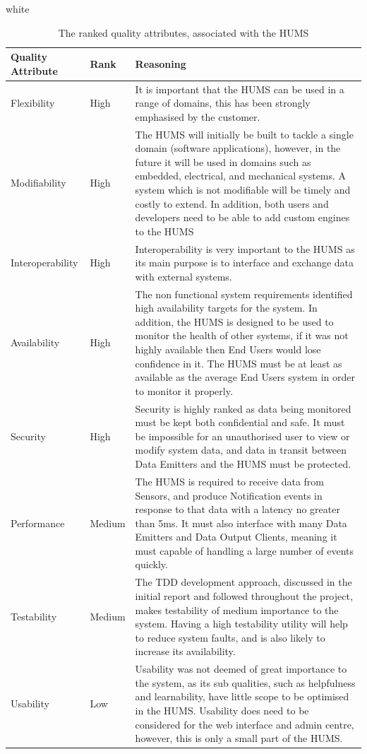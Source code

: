\documentclass[10pt,a4paper]{article}
\newcommand{\tableformat}[4]{
\begin{table}[H]
\centering
  \rowcolors{2}{gray!10} {white}
\begin{tabular}{#1}
  \hline
  \rowcolor[gray]{0.9} #2
\end{tabular}
\caption{#3}
\label{#4}
\end{table}}
\begin{document}
\tableformat{p{2.4cm} p{1.2cm} p{11.2cm}}{
\hline
Quality \qquad Attribute & Rank & Reasoning \\
\hline
Flexibility & High &  It is important that the HUMS can be used in a range of domains, this has been strongly emphasised by the customer. 
\\
Modifiability & High & The HUMS will initially be built to tackle a single domain (software applications), however, in the future it will be used in domains such as embedded, electrical, and mechanical systems. A system which is not modifiable will be timely and costly to extend. In addition, both users and developers need to be able to add custom engines to the HUMS
\\
Interoperability & High & Interoperability is very important to the HUMS as its main purpose is to interface and exchange data with external systems. 
\\
Availability & High &  The non functional system requirements identified high availability targets for the system. In addition, the HUMS is designed to be used to monitor the health of other systems, if it was not highly available then End Users would lose confidence in it. The HUMS must be at least as available as the average End Users system in order to monitor it properly. 
 \\
Security & High & Security is highly ranked as data being monitored must be kept both confidential and safe. It must be impossible for an unauthorised user to view or modify system data, and data in transit between Data Emitters and the HUMS must be protected.
\\
Performance & Medium & The HUMS is required to receive data from Sensors, and produce Notification events in response to that data with a latency no greater than 5ms. It must also  interface with many Data Emitters and Data Output Clients, meaning it must capable of handling a large number of events quickly. 
\\
Testability & Medium & The TDD development approach, discussed in the initial report and followed throughout the project, makes testability of medium importance to the system. Having a high testability utility will help to reduce system faults, and is also likely to increase its availability. 
\\
Usability & Low & Usability was not deemed of great importance to the system, as its sub qualities, such as helpfulness and learnability, have little scope to be optimised in the HUMS. Usability does need to be considered for the web interface and admin centre, however, this is only a small part of the HUMS.
\\
}{The ranked quality attributes, associated with the HUMS}{tab:qualities}
\end{document}
